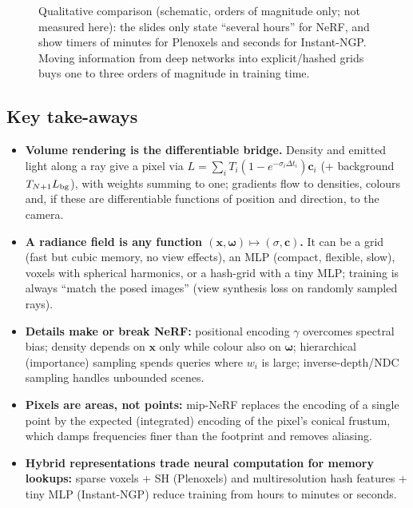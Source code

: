 \documentclass[11pt,a4paper]{article}
\newcommand{\om}{\boldsymbol{\omega}}
\newcommand{\cc}{\boldsymbol{c}}
\newcommand{\xx}{\boldsymbol{x}}
\theoremstyle{definition}
\theoremstyle{plain}
\theoremstyle{remark}
\begin{document}
\begin{figure}[H]
\centering
{}
\caption{Qualitative comparison (schematic, orders of magnitude only; not measured here): the slides only state ``several hours'' for NeRF, and show timers of minutes for Plenoxels and seconds for Instant-NGP. Moving information from deep networks into explicit/hashed grids buys one to three orders of magnitude in training time.}
\end{figure}

\subsection*{Key take-aways}
\begin{itemize}
\item \textbf{Volume rendering is the differentiable bridge.} Density and emitted light along a ray give a pixel via $L=\sum_iT_i(1-e^{-\sigma_i\Delta t_i})\cc_i$ (+ background $T_{N+1}L_{\rm bg}$), with weights summing to one; gradients flow to densities, colours and, if these are differentiable functions of position and direction, to the camera.
\item \textbf{A radiance field is any function $(\xx,\om)\mapsto(\sigma,\cc)$.} It can be a grid (fast but cubic memory, no view effects), an MLP (compact, flexible, slow), voxels with spherical harmonics, or a hash-grid with a tiny MLP; training is always ``match the posed images'' (view synthesis loss on randomly sampled rays).
\item \textbf{Details make or break NeRF:} positional encoding $\gamma$ overcomes spectral bias; density depends on $\xx$ only while colour also on $\om$; hierarchical (importance) sampling spends queries where $w_i$ is large; inverse-depth/NDC sampling handles unbounded scenes.
\item \textbf{Pixels are areas, not points:} mip-NeRF replaces the encoding of a single point by the expected (integrated) encoding of the pixel's conical frustum, which damps frequencies finer than the footprint and removes aliasing.
\item \textbf{Hybrid representations trade neural computation for memory lookups:} sparse voxels + SH (Plenoxels) and multiresolution hash features + tiny MLP (Instant-NGP) reduce training from hours to minutes or seconds.
\end{itemize}
\end{document}

